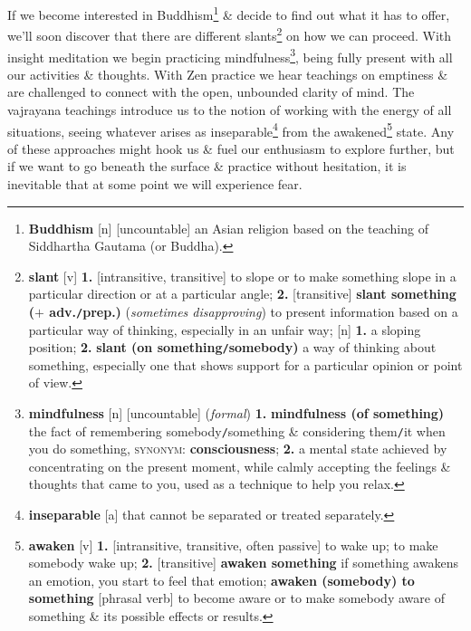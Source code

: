 \documentclass[oneside]{book}
\numberwithin{equation}{section}
\begin{document}
If we become interested in Buddhism\footnote{\textbf{Buddhism} [n] [uncountable] an Asian religion based on the teaching of Siddhartha Gautama (or Buddha).} \& decide to find out what it has to offer, we'll soon discover that there are different slants\footnote{\textbf{slant} [v] \textbf{1.} [intransitive, transitive] to slope or to make something slope in a particular direction or at a particular angle; \textbf{2.} [transitive] \textbf{slant something ($+$ adv.\texttt{/}prep.)} (\textit{sometimes disapproving}) to present information based on a particular way of thinking, especially in an unfair way; [n] \textbf{1.} a sloping position; \textbf{2.} \textbf{slant (on something\texttt{/}somebody)} a way of thinking about something, especially one that shows support for a particular opinion or point of view.} on how we can proceed. With insight meditation we begin practicing mindfulness\footnote{\textbf{mindfulness} [n] [uncountable] (\textit{formal}) \textbf{1.} \textbf{mindfulness (of something)} the fact of remembering somebody\texttt{/}something \& considering them\texttt{/}it when you do something, \textsc{synonym}: \textbf{consciousness}; \textbf{2.} a mental state achieved by concentrating on the present moment, while calmly accepting the feelings \& thoughts that came to you, used as a technique to help you relax.}, being fully present with all our activities \& thoughts. With Zen practice we hear teachings on emptiness \& are challenged to connect with the open, unbounded clarity of mind. The vajrayana teachings introduce us to the notion of working with the energy of all situations, seeing whatever arises as inseparable\footnote{\textbf{inseparable} [a] that cannot be separated or treated separately.} from the awakened\footnote{\textbf{awaken} [v] \textbf{1.} [intransitive, transitive, often passive] to wake up; to make somebody wake up; \textbf{2.} [transitive] \textbf{awaken something} if something awakens an emotion, you start to feel that emotion; \textbf{awaken (somebody) to something} [phrasal verb] to become aware or to make somebody aware of something \& its possible effects or results.} state. Any of these approaches might hook us \& fuel our enthusiasm to explore further, but if we want to go beneath the surface \& practice without hesitation, it is inevitable that at some point we will experience fear.
\end{document}
